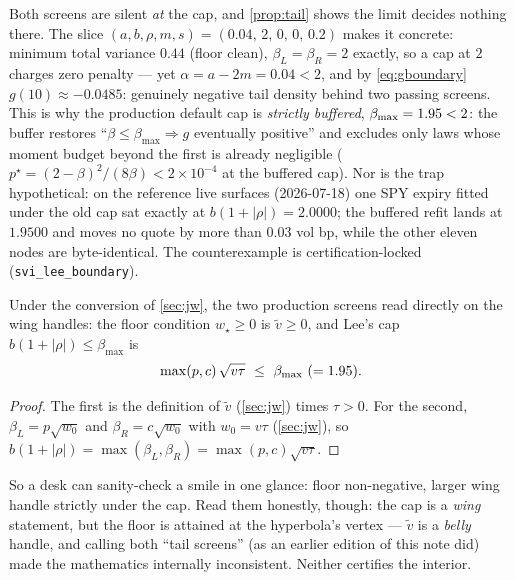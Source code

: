 \documentclass[11pt]{article}
\newcommand{\wmin}{w_\star}         %
\newcommand{\vmin}{\widetilde v}    %
\newcommand{\betL}{\beta_L}
\newcommand{\betR}{\beta_R}
\begin{document}
\begin{caution}[title={Caution --- the boundary itself is a trap (committee revision R1, 2026-07-24)}]
Both screens are silent \emph{at} the cap, and \cref{prop:tail} shows the
limit decides nothing there.  The slice
$(a,b,\rho,m,s)=(0.04,\,2,\,0,\,0,\,0.2)$ makes it concrete: minimum total
variance $0.44$ (floor clean), $\betL=\betR=2$ exactly, so a cap at $2$
charges zero penalty --- yet $\alpha=a-2m=0.04<2$, and by
\eqref{eq:gboundary} $g(10)\approx-0.0485$: genuinely negative tail density
behind two passing screens.  This is why the production default cap is
\emph{strictly buffered}, $\beta_{\max}=1.95<2$: the buffer restores
``$\beta\le\beta_{\max}\Rightarrow g$ eventually positive'' and excludes only
laws whose moment budget beyond the first is already negligible
($p^\star=(2-\beta)^2/(8\beta)<2\times10^{-4}$ at the buffered cap).  Nor is
the trap hypothetical: on the reference live surfaces (2026-07-18) one SPY
expiry fitted under the old cap sat exactly at $b(1+|\rho|)=2.0000$; the
buffered refit lands at $1.9500$ and moves no quote by more than $0.03$ vol
bp, while the other eleven nodes are byte-identical.  The counterexample is
certification-locked (\texttt{svi\_lee\_boundary}).
\end{caution}

\begin{proposition}
\label{prop:screensjw}
Under the conversion of \cref{sec:jw}, the two production screens read directly
on the wing handles: the floor condition $\wmin\ge0$ is $\vmin\ge0$, and Lee's
cap $b(1+|\rho|)\le\beta_{\max}$ is
\[
\max(p,c)\,\sqrt{v\tau}\ \le\ \beta_{\max}\ (=\svimomleecap).
\]
\end{proposition}

\begin{proof}
The first is the definition of $\vmin$ (\cref{sec:jw}) times $\tau>0$.  For the
second, $\betL=p\sqrt{w_0}$ and $\betR=c\sqrt{w_0}$ with $w_0=v\tau$
(\cref{sec:jw}), so $b(1+|\rho|)=\max(\betL,\betR)=\max(p,c)\sqrt{v\tau}$.
\end{proof}

So a desk can sanity-check a smile in one glance: floor non-negative, larger
wing handle strictly under the cap.  Read them honestly, though: the cap is a
\emph{wing} statement, but the floor is attained at the hyperbola's vertex ---
$\vmin$ is a \emph{belly} handle, and calling both ``tail screens'' (as an
earlier edition of this note did) made the mathematics internally
inconsistent.  Neither certifies the interior.
\end{document}

